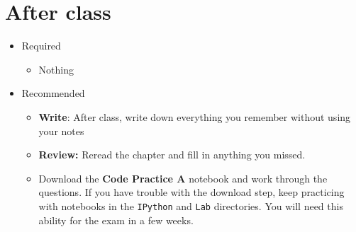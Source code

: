 \documentclass[11pt]{article}
\begin{document}
\section*{After class}

\begin{itemize}
\item Required
\begin{itemize}
\item Nothing
\end{itemize}
\item Recommended
\begin{itemize}
\item {\bf Write}:  After class, write down everything you remember without using your notes
\item {\bf Review:} Reread the chapter and fill in anything you missed.
\item Download the {\bf Code Practice A} notebook and work through the questions.
If you have trouble with the download step, keep practicing with notebooks
in the {\tt IPython} and {\tt Lab} directories.
You will need this ability for the exam in a few weeks.
\end{itemize}
\end{itemize}


\end{document}
